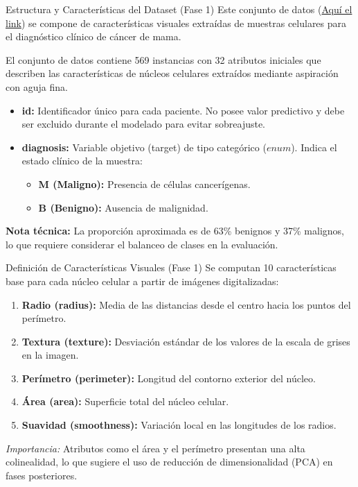 \documentclass{beamer}
\begin{document}
	
	\begin{frame}{Estructura y Características del Dataset (Fase 1)}
		Este conjunto de datos (\href{https://www.kaggle.com/datasets/erdemtaha/cancer-data}{Aquí el link})  se compone de características visuales extraídas de muestras celulares para el diagnóstico clínico de cáncer de mama.
		
		El conjunto de datos contiene 569 instancias con 32 atributos iniciales que describen las características de núcleos celulares extraídos mediante aspiración con aguja fina.
		
		\begin{itemize}
			\item<2-> \textbf{id:} Identificador único para cada paciente. No posee valor predictivo y debe ser excluido durante el modelado para evitar sobreajuste.
			\item<3-> \textbf{diagnosis:} Variable objetivo (target) de tipo categórico ($enum$). Indica el estado clínico de la muestra:
			\begin{itemize}
				\item \textbf{M (Maligno):} Presencia de células cancerígenas.
				\item \textbf{B (Benigno):} Ausencia de malignidad.
			\end{itemize}
		\end{itemize}
		
		\textbf{Nota técnica:} La proporción aproximada es de 63\% benignos y 37\% malignos, lo que requiere considerar el balanceo de clases en la evaluación.
	\end{frame}
	
	\begin{frame}{Definición de Características Visuales (Fase 1)}
		Se computan 10 características base para cada núcleo celular a partir de imágenes digitalizadas:
		
		\begin{enumerate}
			\item<2-> \textbf{Radio (radius):} Media de las distancias desde el centro hacia los puntos del perímetro.
			\item<3-> \textbf{Textura (texture):} Desviación estándar de los valores de la escala de grises en la imagen.
			\item<4-> \textbf{Perímetro (perimeter):} Longitud del contorno exterior del núcleo.
			\item<5-> \textbf{Área (area):} Superficie total del núcleo celular.
			\item<6-> \textbf{Suavidad (smoothness):} Variación local en las longitudes de los radios.
		\end{enumerate}
		
		\textit{Importancia:} Atributos como el área y el perímetro presentan una alta colinealidad, lo que sugiere el uso de reducción de dimensionalidad (PCA) en fases posteriores.
	\end{frame}
	
\end{document}
